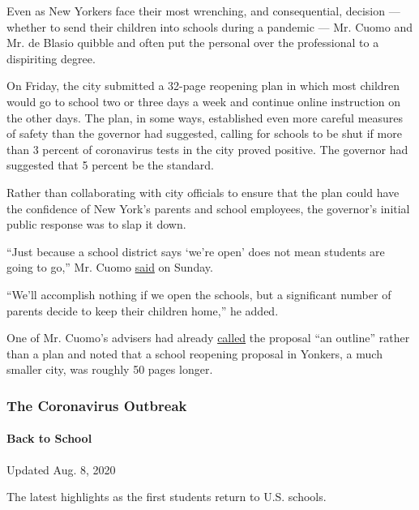 Even as New Yorkers face their most wrenching, and consequential,
decision --- whether to send their children into schools during a
pandemic --- Mr. Cuomo and Mr. de Blasio quibble and often put the
personal over the professional to a dispiriting degree.

On Friday, the city submitted a 32-page reopening plan in which most
children would go to school two or three days a week and continue online
instruction on the other days. The plan, in some ways, established even
more careful measures of safety than the governor had suggested, calling
for schools to be shut if more than 3 percent of coronavirus tests in
the city proved positive. The governor had suggested that 5 percent be
the standard.

Rather than collaborating with city officials to ensure that the plan
could have the confidence of New York's parents and school employees,
the governor's initial public response was to slap it down.

``Just because a school district says `we're open' does not mean
students are going to go,'' Mr. Cuomo
\href{https://www.nydailynews.com/news/politics/ny-cuomo-de-blasio-schools-reopen-20200802-s3bdp5yix5he7mrxr2uez2cwfu-story.html}{said}
on Sunday.

``We'll accomplish nothing if we open the schools, but a significant
number of parents decide to keep their children home,'' he added.

One of Mr. Cuomo's advisers had already
\href{https://nypost.com/2020/08/02/senior-cuomo-aide-slams-de-blasios-reopening-plan-as-an-outline/}{called}
the proposal ``an outline'' rather than a plan and noted that a school
reopening proposal in Yonkers, a much smaller city, was roughly 50 pages
longer.

\hypertarget{the-coronavirus-outbreak}{%
\subsubsection{The Coronavirus
Outbreak}\label{the-coronavirus-outbreak}}

\hypertarget{back-to-school}{%
\paragraph{Back to School}\label{back-to-school}}

Updated Aug. 8, 2020

The latest highlights as the first students return to U.S. schools.

